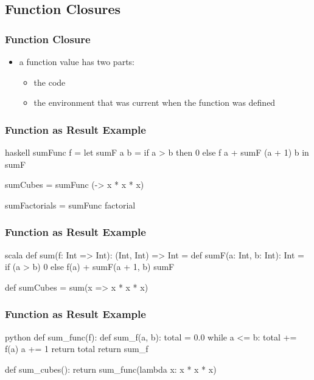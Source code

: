 \documentclass[dvipsnames]{beamer}
\theoremstyle{plain}
\begin{document}
\subsection{Function Closures}

\begin{frame}[fragile]
  \frametitle{Function Closure}

  \begin{itemize}
    \item a function value has two parts:
    \begin{itemize}
      \item the code
      \item the environment that was current when the function was defined
    \end{itemize}
  \end{itemize}
\end{frame}

\begin{frame}[fragile]
  \frametitle{Function as Result Example}

  \begin{example}[Haskell]
    \begin{pygments}{haskell}
sumFunc f =
    let
        sumF a b =
            if a > b
            then 0
            else f a + sumF (a + 1) b
    in
        sumF

sumCubes = sumFunc (\x -> x * x * x)

sumFactorials = sumFunc factorial
    \end{pygments}
  \end{example}
\end{frame}

\begin{frame}[fragile]
  \frametitle{Function as Result Example}

  \begin{example}[Scala]
    \begin{pygments}{scala}
def sum(f: Int => Int): (Int, Int) => Int = {
    def sumF(a: Int, b: Int): Int =
        if (a > b) 0
        else f(a) + sumF(a + 1, b)
    sumF
}

def sumCubes = sum(x => x * x * x)
    \end{pygments}
  \end{example}
\end{frame}

\begin{frame}[fragile]
  \frametitle{Function as Result Example}

  \begin{example}[Python]
    \begin{pygments}{python}
def sum_func(f):
    def sum_f(a, b):
        total = 0.0
        while a <= b:
            total += f(a)
            a += 1
        return total
    return sum_f

def sum_cubes():
    return sum_func(lambda x: x * x * x)
    \end{pygments}
  \end{example}
\end{frame}
\end{document}
